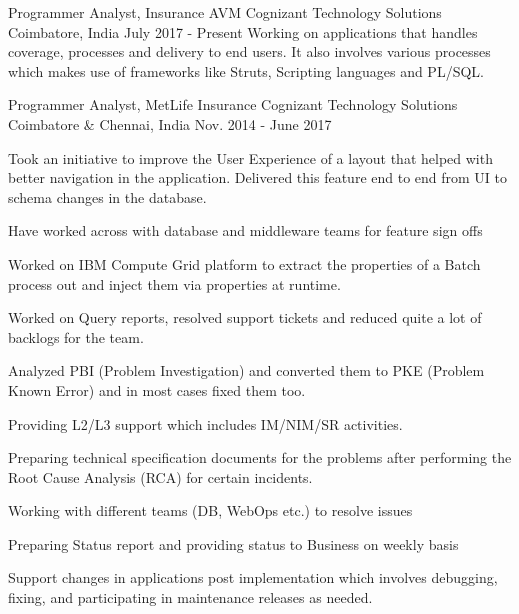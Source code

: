 

\begin{cventries}

  \cventry
    {Programmer Analyst, Insurance AVM} %
    {Cognizant Technology Solutions} %
    {Coimbatore, India} %
    {July 2017 - Present} %
    {
    Working on applications that handles coverage, processes and delivery to end users. It also involves various processes which makes use of frameworks like Struts, Scripting languages and PL/SQL.
    }

  \cventry
    {Programmer Analyst, MetLife Insurance} %
    {Cognizant Technology Solutions} %
    {Coimbatore \& Chennai, India} %
    {Nov. 2014 - June 2017} %
    {
      \begin{cvitems}
        \item{Took an initiative to improve the User Experience of a layout that helped with better navigation in the application. Delivered this feature end to end from UI to schema changes in the database.}
        \item{Have worked across with database and middleware teams for feature sign offs}
        \item{Worked on IBM Compute Grid platform to extract the properties of a Batch process out and inject them via properties at runtime.}
        \item{Worked on Query reports, resolved support tickets and reduced quite a lot of backlogs for the team.}
        \item{Analyzed PBI (Problem Investigation) and converted them to PKE (Problem Known Error) and in most cases fixed them too.}
        \item{Providing L2/L3 support which includes IM/NIM/SR activities.}
        \item{Preparing technical specification documents for the problems after performing the Root Cause Analysis (RCA) for certain incidents.}
        \item{Working with different teams (DB, WebOps etc.) to resolve issues}
        \item{Preparing Status report and providing status to Business on weekly basis}
        \item{Support changes in applications post implementation which involves debugging, fixing, and participating in maintenance releases as needed.}
      \end{cvitems}
    }

\end{cventries}
